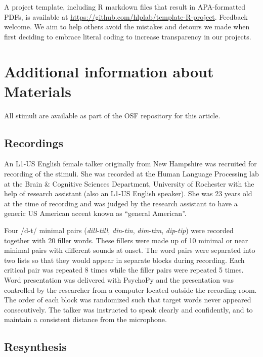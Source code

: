 \documentclass[
  11pt,
  man,mask,floatsintext]{apa6}
\begin{document}
A project template, including R markdown files that result in APA-formatted PDFs, is available at \url{https://github.com/hlplab/template-R-project}. Feedback welcome. We aim to help others avoid the mistakes and detours we made when first deciding to embrace literal coding to increase transparency in our projects.

\section{Additional information about Materials}\label{sec:stimulus-generation}

All stimuli are available as part of the OSF repository for this article.

\subsection{Recordings}\label{recordings}

An L1-US English female talker originally from New Hampshire was recruited for recording of the stimuli. She was recorded at the Human Language Processing lab at the Brain \& Cognitive Sciences Department, University of Rochester with the help of research assistant (also an L1-US English speaker). She was 23 years old at the time of recording and was judged by the research assistant to have a generic US American accent known as ``general American''.

Four /d-t/ minimal pairs (\emph{dill}-\emph{till}, \emph{din}-\emph{tin}, \emph{dim}-\emph{tim}, \emph{dip}-\emph{tip}) were recorded together with 20 filler words. These fillers were made up of 10 minimal or near minimal pairs with different sounds at onset. The word pairs were separated into two lists so that they would appear in separate blocks during recording. Each critical pair was repeated 8 times while the filler pairs were repeated 5 times. Word presentation was delivered with PsychoPy \autocite{peirce2007} and the presentation was controlled by the researcher from a computer located outside the recording room. The order of each block was randomized such that target words never appeared consecutively. The talker was instructed to speak clearly and confidently, and to maintain a consistent distance from the microphone.

\subsection{Resynthesis}\label{resynthesis}
\end{document}
